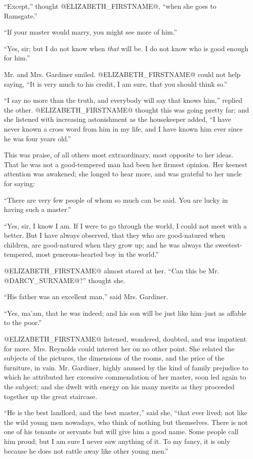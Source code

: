 ``Except,'' thought @ELIZABETH_FIRSTNAME@, ``when she goes to Ramsgate.''

``If your master would marry, you might see more of him.''

``Yes, sir; but I do not know when \textit{that} will be. I do not know who is
good enough for him.''

Mr. and Mrs. Gardiner smiled. @ELIZABETH_FIRSTNAME@ could not help saying, ``It is
very much to his credit, I am sure, that you should think so.''

``I say no more than the truth, and everybody will say that knows him,''
replied the other. @ELIZABETH_FIRSTNAME@ thought this was going pretty far; and she
listened with increasing astonishment as the housekeeper added, ``I have
never known a cross word from him in my life, and I have known him ever
since he was four years old.''

This was praise, of all others most extraordinary, most opposite to her
ideas. That he was not a good-tempered man had been her firmest opinion.
Her keenest attention was awakened; she longed to hear more, and was
grateful to her uncle for saying:

``There are very few people of whom so much can be said. You are lucky in
having such a master.''

``Yes, sir, I know I am. If I were to go through the world, I could
not meet with a better. But I have always observed, that they who are
good-natured when children, are good-natured when they grow up; and
he was always the sweetest-tempered, most generous-hearted boy in the
world.''

@ELIZABETH_FIRSTNAME@ almost stared at her. ``Can this be Mr. @DARCY_SURNAME@?'' thought she.

``His father was an excellent man,'' said Mrs. Gardiner.

``Yes, ma'am, that he was indeed; and his son will be just like him--just
as affable to the poor.''

@ELIZABETH_FIRSTNAME@ listened, wondered, doubted, and was impatient for more. Mrs.
Reynolds could interest her on no other point. She related the subjects
of the pictures, the dimensions of the rooms, and the price of the
furniture, in vain. Mr. Gardiner, highly amused by the kind of family
prejudice to which he attributed her excessive commendation of her
master, soon led again to the subject; and she dwelt with energy on his
many merits as they proceeded together up the great staircase.

``He is the best landlord, and the best master,'' said she, ``that ever
lived; not like the wild young men nowadays, who think of nothing but
themselves. There is not one of his tenants or servants but will give
him a good name. Some people call him proud; but I am sure I never saw
anything of it. To my fancy, it is only because he does not rattle away
like other young men.''

